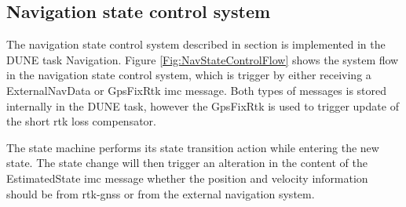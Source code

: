 \subsection{Navigation state control system}
The navigation state control system described in section \citep{S:NavState} is implemented in the DUNE task Navigation. Figure \ref{Fig:NavStateControlFlow} shows the system flow in the navigation state control system, which is trigger by either receiving a ExternalNavData or GpsFixRtk \gls{imc} message. Both types of messages is stored internally in the DUNE task, however the GpsFixRtk is used to trigger update of the short rtk loss compensator.

The state machine performs its state transition action while entering the new state. The state change will then trigger an alteration in the content of the EstimatedState \gls{imc} message whether the position and velocity information should be from \gls{rtk-gnss} or from the external navigation system.


